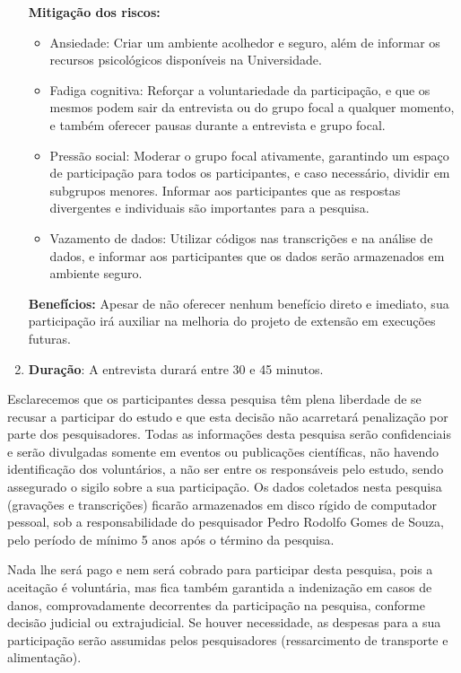 \begin{enumerate}
\begin{itemize}
    \end{itemize}
    \textbf{Mitigação dos riscos:}
    \begin{itemize}
        \item Ansiedade: Criar um ambiente acolhedor e seguro, além de informar os recursos psicológicos disponíveis na Universidade.
        \item Fadiga cognitiva: Reforçar a voluntariedade da participação, e que os mesmos podem sair da entrevista ou do grupo focal a qualquer momento, e também oferecer pausas durante a entrevista e grupo focal.
        \item Pressão social: Moderar o grupo focal ativamente, garantindo um espaço de participação para todos os participantes, e caso necessário, dividir em subgrupos menores. Informar aos participantes que as respostas divergentes e individuais são importantes para a pesquisa.
        \item Vazamento de dados: Utilizar códigos nas transcrições e na análise de dados, e informar aos participantes que os dados serão armazenados em ambiente seguro.
    \end{itemize}
    \textbf{Benefícios:} Apesar de não oferecer nenhum benefício direto e imediato, sua participação irá auxiliar na melhoria do projeto de extensão em execuções futuras.
    \item \textbf{Duração}: A entrevista durará entre 30 e 45 minutos.
\end{enumerate}

Esclarecemos que os participantes dessa pesquisa têm plena liberdade de se recusar a participar do estudo e que esta decisão não acarretará penalização por parte dos pesquisadores. Todas as informações desta pesquisa serão confidenciais e serão divulgadas somente em eventos ou publicações científicas, não havendo identificação dos voluntários, a não ser entre os responsáveis pelo estudo, sendo assegurado o sigilo sobre a sua participação. Os dados coletados nesta pesquisa (gravações e transcrições) ficarão armazenados em disco rígido de computador pessoal, sob a responsabilidade do pesquisador Pedro Rodolfo Gomes de Souza, pelo período de mínimo 5 anos após o término da pesquisa.

Nada lhe será pago e nem será cobrado para participar desta pesquisa, pois a aceitação é voluntária, mas fica também garantida a indenização em casos de danos, comprovadamente decorrentes da participação na pesquisa, conforme decisão judicial ou extrajudicial. Se houver necessidade, as despesas para a sua participação serão assumidas pelos pesquisadores (ressarcimento de transporte e alimentação).

